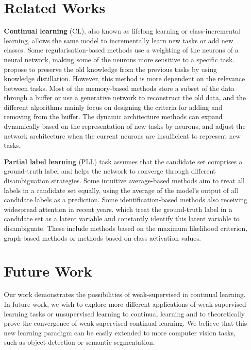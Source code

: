 \documentclass{article} %
\begin{document}
\section{Related Works}
\textbf{Continual learning} (CL), also known as lifelong learning or class-incremental learning, allows the same model to incrementally learn new tasks or add new classes.
Some regularisation-based methods use a weighting of the neurons of a neural network, making some of the neurons more sensitive to a specific task\citep{JamesKirkpatrick2016OvercomingCF}.
\citet{ZhizhongLi2016LearningWF} propose to preserve the old knowledge from the previous tasks by using knowledge distillation\citep{GeoffreyEHinton2015DistillingTK}. However, this method is more dependent on the relevance between tasks.
Most of the memory-based methods store a subset of the data through a buffer or use a generative network to reconstruct the old data, and the different algorithms mainly focus on designing the criteria for adding and removing from the buffer\citep{MIR, RahafAljundi2019GradientBS}.
The dynamic architecture methods can expand dynamically based on the representation of new tasks by neurons, and adjust the network architecture when the current neurons are insufficient to represent new tasks\citep{SoochanLee2020AND, JaehongYoon2017LifelongLW}. 

\textbf{Partial label learning} (PLL) task assumes that the candidate set comprises a ground-truth label and helps the network to converge through different disambiguation strategies.
Some intuitive average-based methods aim to treat all labels in a candidate set equally, using the average of the model's output of all candidate labels as a prediction\citep{EykeHllermeier2005LearningFA, JiaqiLv2020ProgressiveIO, TimotheeCour2011LearningFP}.
Some identification-based methods also receiving widespread attention in recent years, which treat the ground-truth label in a candidate set as a latent variable and constantly identify this latent variable to disambiguate.
These include methods based on the maximum likelihood criterion\citep{RongJin2002LearningWM}, graph-based methods\citep{MinLingZhang2016PartialLL, GengyuLyu2019GMPLLGM} or methods based on class activation values\citep{FeiZhang2022EXPLOITINGCA}. 

\section{Future Work}
Our work demonstrates the possibilities of weak-supervised in continual learning. In future work, we wish to explore more different applications of weak-supervised learning tasks or unsupervised learning to continual learning and to theoretically prove the convergence of weak-supervised continual learning. We believe that this new learning paradigm can be easily extended to more computer vision tasks, such as object detection or semantic segmentation.
\end{document}
